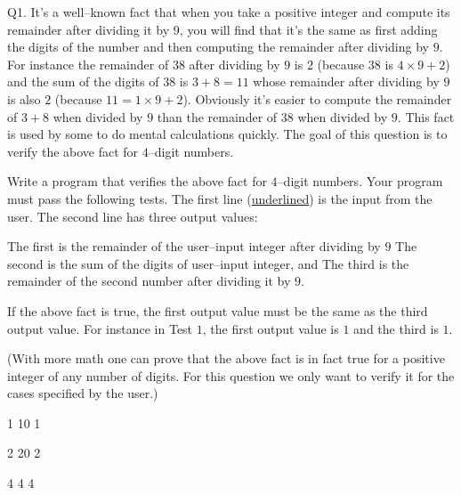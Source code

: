 Q1. It's a well--known fact that when you take a positive integer and compute its remainder after dividing it by $9$, you will find that it's the same as first adding the digits of the number and then computing the remainder after dividing by $9$. For instance the remainder of $38$ after dividing by $9$ is $2$ (because $38$ is $4 \times 9 + 2$) and the sum of the digits of $38$ is $3 + 8 = 11$ whose remainder after dividing by $9$ is also $2$ (because $11 = 1 \times 9 + 2$). Obviously it's easier to compute the remainder of $3 + 8$ when divided by $9$ than the remainder of $38$ when divided by $9$. This fact is used by some to do mental calculations quickly. The goal of this question is to verify the above fact for $4$--digit numbers.

Write a program that verifies the above fact for $4$--digit numbers. Your program must pass the following tests. The first line (\underline{underlined}) is the input from the user. The second line has three output values: 
\begin{tightlist}
\li The first is the remainder of the user--input integer after dividing by $9$
\li The second is the sum of the digits of user--input integer, and 
\li The third is the remainder of the second number after dividing it by $9$. 
\end{tightlist}
If the above fact is true, the first output value must be the same as the third output value. For instance in Test $1$, the first output value is $1$ and the third is $1$.

(With more math one can prove that the above fact is in fact true for a positive integer of any number of digits. For this question we only want to verify it for the cases specified by the user.)

\resett
\nextt
\begin{console}[commandchars=\\\{\}]
1 10 1
\end{console}

\nextt
\begin{console}[commandchars=\\\{\}]
2 20 2
\end{console}

\nextt
\begin{console}[commandchars=\\\{\}]
4 4 4
\end{console}
